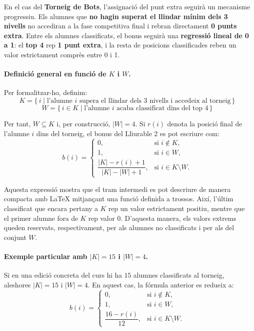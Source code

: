 En el cas del \textbf{Torneig de Bots}, l'assignaci\'o del punt extra seguir\`a un mecanisme progressiu. Els alumnes que \textbf{no hagin superat el llindar m\'inim dels 3 nivells} no accediran a la fase competitiva final i rebran directament \textbf{0 punts extra}. Entre els alumnes classificats, el bonus seguir\`a una \textbf{regressi\'o lineal de 0 a 1}: el \textbf{top 4} rep \textbf{1 punt extra}, i la resta de posicions classificades reben un valor estrictament compr\`es entre 0 i 1.

\paragraph{Definici\'o general en funci\'o de \(K\) i \(W\).}
Per formalitzar-ho, definim:
\[
K = \{\, i \mid \text{l'alumne } i \text{ supera el llindar dels 3 nivells i accedeix al torneig} \,\}
\]
\[
W = \{\, i \in K \mid \text{l'alumne } i \text{ acaba classificat dins del top 4} \,\}
\]

Per tant, \(W \subseteq K\) i, per construcci\'o, \(|W|=4\). Si \(r(i)\) denota la posici\'o final de l'alumne \(i\) dins del torneig, el bonus del Lliurable 2 es pot escriure com:
\[
b(i)=
\begin{cases}
0, & \text{si } i \notin K, \\
1, & \text{si } i \in W, \\
\dfrac{|K|-r(i)+1}{|K|-|W|+1}, & \text{si } i \in K \setminus W.
\end{cases}
\]

Aquesta expressi\'o mostra que el tram intermedi es pot descriure de manera compacta amb LaTeX mitjan\c{c}ant una funci\'o definida a trossos. Aix\'i, l'\'ultim classificat que encara pertany a \(K\) rep un valor estrictament positiu, mentre que el primer alumne fora de \(K\) rep valor \(0\). D'aquesta manera, els valors extrems queden reservats, respectivament, per als alumnes no classificats i per als del conjunt \(W\).

\paragraph{Exemple particular amb \(\lvert K \rvert = 15\) i \(\lvert W \rvert = 4\).}
Si en una edici\'o concreta del curs hi ha \(15\) alumnes classificats al torneig, aleshores \(|K|=15\) i \(|W|=4\). En aquest cas, la f\'ormula anterior es redueix a:
\[
b(i)=
\begin{cases}
0, & \text{si } i \notin K, \\
1, & \text{si } i \in W, \\
\dfrac{16-r(i)}{12}, & \text{si } i \in K \setminus W.
\end{cases}
\]

